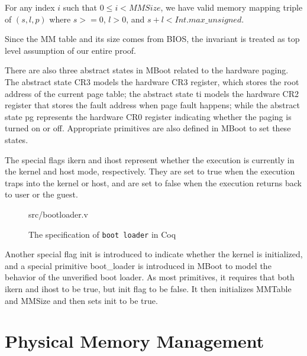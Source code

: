 \begin{invariant}[MM valid]
For any index $i$ such that $0\le i<MMSize$, we have valid memory mapping
triple of $(s, l, p)$ where $s >= 0$, $l > 0$, and $s + l < Int.max\_unsigned$.
\end{invariant}

Since the MM table and its size comes from BIOS, the invariant is treated as top level
assumption of our entire proof. 

There are also three abstract states in MBoot related to the hardware paging.
The abstract state \textsf{CR3} models the hardware \textsf{CR3} register,
which stores the root address of the current page table; the abstract state
\textsf{ti} models the hardware \textsf{CR2} register that stores the fault address
when page fault happens; while the abstract state \textsf{pg} represents
the hardware \textsf{CR0} register indicating whether the paging is turned on or off.
Appropriate primitives are also defined in MBoot to set these states.

The special flags \textsf{ikern} and \textsf{ihost} represent whether the execution
is currently in the kernel and host mode, respectively. They are set to \textsf{true}
when the execution traps into the kernel or host, and are set to \textsf{false} when
the execution returns back to user or the guest.


\begin{figure}
	 {src/bootloader.v}
	\caption{The specification of \texttt{boot loader} in Coq}
	\label{fig:bootloader_v}
\end{figure}



Another special flag \textsf{init} is introduced to indicate whether the kernel
is initialized, and a
special primitive \textsf{boot\_loader} is introduced in MBoot to model
the behavior of the unverified boot loader. As most primitives, it requires that
both \textsf{ikern} and \textsf{ihost} to be \textsf{true}, but \textsf{init}
flag to be \textsf{false}. It then initializes \textsf{MMTable} and \textsf{MMSize}
and then sets \textsf{init} to be \textsf{true}. 


\section{Physical Memory Management}

